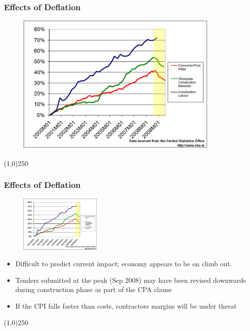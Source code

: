 \begin{frame}
\frametitle{Effects of Deflation}
\begin{figure}
	\centering
		\includegraphics[width = 10cm]{images/deflation2.jpg}
	\label{fig:deflation2}
\end{figure}
\end{frame}
\begin{center}\line(1,0){250}\end{center}







\begin{frame}
\frametitle{Effects of Deflation}

\begin{figure}
	\centering
		\includegraphics[width = 4cm]{images/deflation2.jpg}
	\label{fig:deflation2a}
\end{figure}

\begin{itemize}
	\item Difficult to predict current impact; economy appears to be on climb out.
	\item Tenders submitted at the peak (Sep 2008) may have been revised downwards during construction phase as part of the CPA clause
	\item If the CPI falls faster than costs, contractors margins will be under threat
\end{itemize}
\end{frame}
\begin{center}\line(1,0){250}\end{center}








